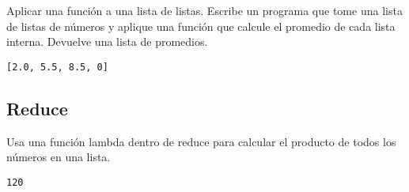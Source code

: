 \begin{exercise}
Aplicar una función a una lista de listas. Escribe un programa que
tome una lista de listas de números y aplique una función que calcule
el promedio de cada lista interna. Devuelve una lista de promedios.

\begin{Shaded}
\begin{Highlighting}[]
     \NormalTok{(}
        \NormalTok{(}
            \OperatorTok{/}  \OperatorTok{\textgreater{}}   \NormalTok{, }
\NormalTok{        )}
\NormalTok{    )}

\OperatorTok{=}\NormalTok{ [[}\NormalTok{, }\NormalTok{, }\NormalTok{], [}\NormalTok{, }\NormalTok{, }\NormalTok{, }\NormalTok{], [}\NormalTok{, }\NormalTok{], []]}
\OperatorTok{=}
\end{Highlighting}
\end{Shaded}

\begin{verbatim}
[2.0, 5.5, 8.5, 0]

\end{verbatim}
\end{exercise}

\subsection{Reduce}

\begin{exercise}
Usa una función lambda dentro de reduce para calcular el producto de
todos los números en una lista.

\begin{Shaded}
\begin{Highlighting}[]
 

\OperatorTok{=}\NormalTok{ [}\NormalTok{, }\NormalTok{, }\NormalTok{, }\NormalTok{, }\NormalTok{]}
\OperatorTok{=} \NormalTok{(}\OperatorTok{*}
\end{Highlighting}
\end{Shaded}

\begin{verbatim}
120

\end{verbatim}
\end{exercise}

